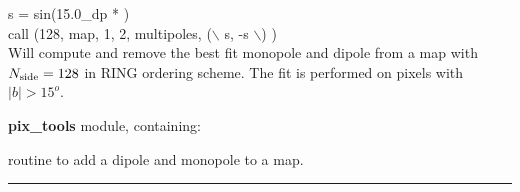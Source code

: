 \newpage
\begin{example}
{
s = sin(15.0\_dp * ) \\
call \thedocid (128, map, 1, 2, multipoles, ($\backslash$ s, -s $\backslash$) )  \\
}
{
Will compute and remove the best fit monopole and dipole from a map with
$N_{\mathrm{side}}=128$ in RING ordering scheme. The fit is performed on pixels with $|b|>15^o$.
}
\end{example}

\begin{modules}
  \begin{sulist}{} %
  \item[\textbf{pix\_tools}] module, containing:
  \end{sulist}
\end{modules}

\begin{related}
  \begin{sulist}{} %
  \item[\htmlref{add\_dipole}{sub:add_dipole}] routine to add a dipole and
  monopole to a map.
  \end{sulist}
\end{related}

\rule{\hsize}{2mm}

\newpage
